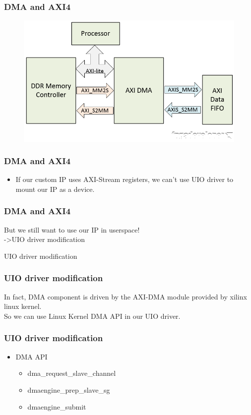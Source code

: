 \documentclass{beamer}
\begin{document}
\begin{frame}
\frametitle{DMA and AXI4}
\begin{figure}
\centering\includegraphics[scale=0.5]{axi-dma-example.png}
\end{figure}
\end{frame}



\begin{frame}
\frametitle{DMA and AXI4}

\begin{itemize}
\item If our custom IP uses AXI-Stream registers, we can't use UIO driver to mount our IP as a device.
\end{itemize}
\end{frame}

\begin{frame}
\frametitle{DMA and AXI4}
\centering But we still want to use our IP in userspace!\\
\pause
\centering\alert {->UIO driver modification}
\end{frame}

\begin{frame}

\centering UIO driver modification
\end{frame}

\begin{frame}
\frametitle{UIO driver modification}
\centering In fact, DMA component is driven by the AXI-DMA module provided by xilinx linux kernel.\\
\centering So we can use Linux Kernel DMA API in our UIO driver.
\end{frame}

\begin{frame}
\frametitle{UIO driver modification}
\begin{itemize}
\item  DMA API\\
\begin{itemize}
\item   dma\_request\_slave\_channel\\
\item   dmaengine\_prep\_slave\_sg\\
\item   dmaengine\_submit
\end{itemize}
\end{itemize}

\end{frame}
\end{document}
